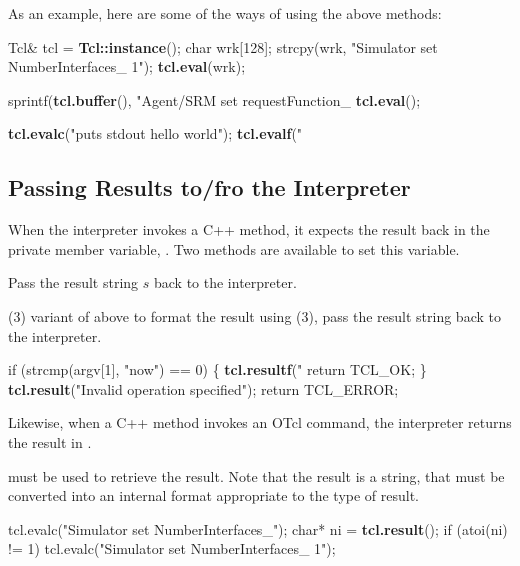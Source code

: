 As an example, here are some of the ways of using the above methods:
\begin{program}
        Tcl& tcl = {\bfseries{}Tcl::instance}();
        char wrk[128];
        strcpy(wrk, "Simulator set NumberInterfaces_ 1");
        {\bfseries{}tcl.eval}(wrk);

        sprintf({\bfseries{}tcl.buffer}(), "Agent/SRM set requestFunction_ %
        {\bfseries{}tcl.eval}();

        {\bfseries{}tcl.evalc}("puts stdout {hello world}");
        {\bfseries{}tcl.evalf}("%
\end{program}

\subsection{Passing Results to/fro the Interpreter}
\label{sec:Result}

When the interpreter invokes a C++ method,
it expects the result back in the private member variable,
.
Two methods are available to set this variable.
\begin{list}{\textbullet}{}
\item {}

        Pass the result string $s$ back to the interpreter.
\item

        (3) variant of above
        to format the result using (3),
        pass the result string back to the interpreter.
\end{list}
\begin{program}
        if (strcmp(argv[1], "now") == 0) \{
                {\bfseries{}tcl.resultf}("%
                return TCL_OK;
        \}
        {\bfseries{}tcl.result}("Invalid operation specified");
        return TCL_ERROR;
\end{program}

Likewise, when a C++ method invokes an OTcl command,
the interpreter returns the result in .
\begin{list}{\textbullet}{}
\item {}
      must be used to retrieve the result.
      Note that the result is a string, that must be converted
      into an internal format appropriate to the type of result.
\end{list}
\begin{program}
        tcl.evalc("Simulator set NumberInterfaces_");
        char* ni = {\bfseries{}tcl.result}();
        if (atoi(ni) != 1)
                tcl.evalc("Simulator set NumberInterfaces_ 1");
\end{program}
        
